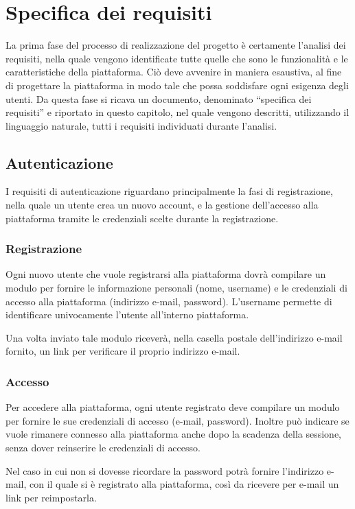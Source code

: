 \chapter{Specifica dei requisiti}\label{cap:specifica_dei_requisiti}
La prima fase del processo di realizzazione del progetto \`e certamente l'analisi dei requisiti, nella quale vengono identificate tutte quelle che sono le funzionalit\`a e le caratteristiche della piattaforma. Ci\`o deve avvenire in maniera esaustiva, al fine di progettare la piattaforma in modo tale che possa soddisfare ogni esigenza degli utenti. Da questa fase si ricava un documento, denominato ``specifica dei requisiti'' e riportato in questo capitolo, nel quale vengono descritti, utilizzando il linguaggio naturale, tutti i requisiti individuati durante l'analisi.

\section{Autenticazione}\label{cap:autenticazione}
I requisiti di autenticazione riguardano principalmente la fasi di registrazione, nella quale un utente crea un nuovo account, e la gestione dell'accesso alla piattaforma tramite le credenziali scelte durante la registrazione.

\subsection{Registrazione}
Ogni nuovo utente che vuole registrarsi alla piattaforma dovr\`a compilare un modulo per fornire le informazione personali (nome, username) e le credenziali di accesso alla piattaforma (indirizzo e-mail, password). L'username permette di identificare univocamente l'utente all'interno piattaforma.

Una volta inviato tale modulo ricever\`a, nella casella postale dell'indirizzo e-mail fornito, un link per verificare il proprio indirizzo e-mail.

\subsection{Accesso}
Per accedere alla piattaforma, ogni utente registrato deve compilare un modulo per fornire le sue credenziali di accesso (e-mail, password). Inoltre pu\`o indicare se vuole rimanere connesso alla piattaforma anche dopo la scadenza della sessione, senza dover reinserire le credenziali di accesso.

Nel caso in cui non si dovesse ricordare la password potr\`a fornire l'indirizzo e-mail, con il quale si \`e registrato alla piattaforma, cos\`i da ricevere per e-mail un link per reimpostarla.
